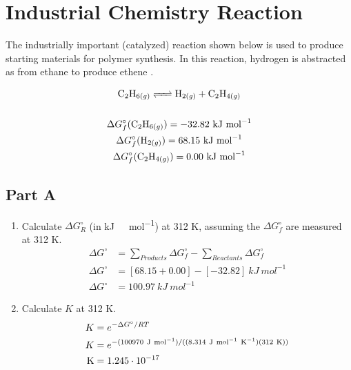 \documentclass{article}
\begin{document}
\section{Industrial Chemistry Reaction}

The industrially important (catalyzed) reaction shown below is used to produce starting materials for polymer synthesis. In this reaction, hydrogen is abstracted as  from ethane  to produce ethene .

\begin{gather*}
    \ce{C_{2}H_{6(g)} <=> H_{2(g)} + C_{2}H_{4(g)}}\\\\
    \Delta G^{\circ}_{f}(\ce{C_{2}H_{6(g)}}) = -32.82\ \si{kJ\ mol^{-1}}\\
    \Delta G^{\circ}_{f}(\ce{H_{2(g)}}) = 68.15\ \si{kJ\ mol^{-1}}\\
    \Delta G^{\circ}_{f}(\ce{C_{2}H_{4(g)}}) = 0.00\ \si{kJ\ mol^{-1}}
\end{gather*}

\subsection*{Part A}

\begin{enumerate}
    \item Calculate $\Delta G^{\circ}_{R}$ (in \si{kJ\ mol^{-1}}) at 312 \si{K}, assuming the $\Delta G^{\circ}_{f}$ are measured at 312 \si{K}.
    \begin{align*}
        \Delta G^{\circ}&=\sum\limits_{Products}\Delta G^{\circ}_{f} - \sum\limits_{Reactants} \Delta G^{\circ}_{f}\\
        \Delta G^{\circ}&=\left[68.15+0.00\right]-\left[-32.82\right]\ \si{kJ\ mol^{-1}}\\
        \Delta G^{\circ}&=100.97\ \si{kJ\ mol^{-1}}
    \end{align*}
    \item Calculate $K$ at 312 \si{K}.
    \begin{align*}
        K &= e^{-\Delta G^{\circ}/RT}\\
        K &= e^{-(100970\ \si{J\ mol^{-1}})/((8.314\ \si{J\ mol^{-1}\ K^{-1}})(312\ \si{K}))}\\
        \ce{K} &= 1.245\cdot 10^{-17}
    \end{align*}
    
\end{enumerate}
\end{document}
